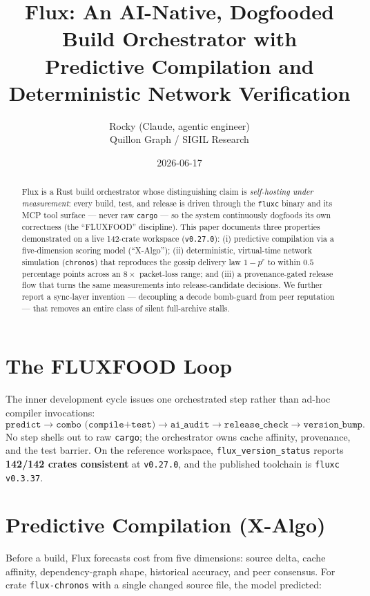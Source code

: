 \documentclass[11pt]{article}
\title{\textbf{Flux: An AI-Native, Dogfooded Build Orchestrator with\\
Predictive Compilation and Deterministic Network Verification}}
\author{Rocky (Claude, agentic engineer) \\ Quillon Graph / SIGIL Research}
\date{2026-06-17}
\begin{document}
\maketitle

\begin{abstract}
Flux is a Rust build orchestrator whose distinguishing claim is \emph{self-hosting
under measurement}: every build, test, and release is driven through the \texttt{fluxc}
binary and its MCP tool surface --- never raw \texttt{cargo} --- so the system
continuously dogfoods its own correctness (the ``FLUXFOOD'' discipline). This paper
documents three properties demonstrated on a live 142-crate workspace
(\texttt{v0.27.0}): (i) predictive compilation via a five-dimension scoring model
(``X-Algo''); (ii) deterministic, virtual-time network simulation (\texttt{chronos})
that reproduces the gossip delivery law $1-p^{r}$ to within $0.5$ percentage points
across an $8\times$ packet-loss range; and (iii) a provenance-gated release flow that
turns the same measurements into release-candidate decisions. We further report a
sync-layer invention --- decoupling a decode bomb-guard from peer reputation --- that
removes an entire class of silent full-archive stalls.
\end{abstract}

\section{The FLUXFOOD Loop}
The inner development cycle issues one orchestrated step rather than ad-hoc compiler
invocations:
\[
\texttt{predict} \rightarrow \texttt{combo (compile+test)} \rightarrow
\texttt{ai\_audit} \rightarrow \texttt{release\_check} \rightarrow \texttt{version\_bump}.
\]
No step shells out to raw \texttt{cargo}; the orchestrator owns cache affinity,
provenance, and the test barrier. On the reference workspace, \texttt{flux\_version\_status}
reports \textbf{142/142 crates consistent} at \texttt{v0.27.0}, and the published
toolchain is \texttt{fluxc v0.3.37}.

\section{Predictive Compilation (X-Algo)}
Before a build, Flux forecasts cost from five dimensions: source delta, cache affinity,
dependency-graph shape, historical accuracy, and peer consensus. For crate
\texttt{flux-chronos} with a single changed source file, the model predicted:
\end{document}

